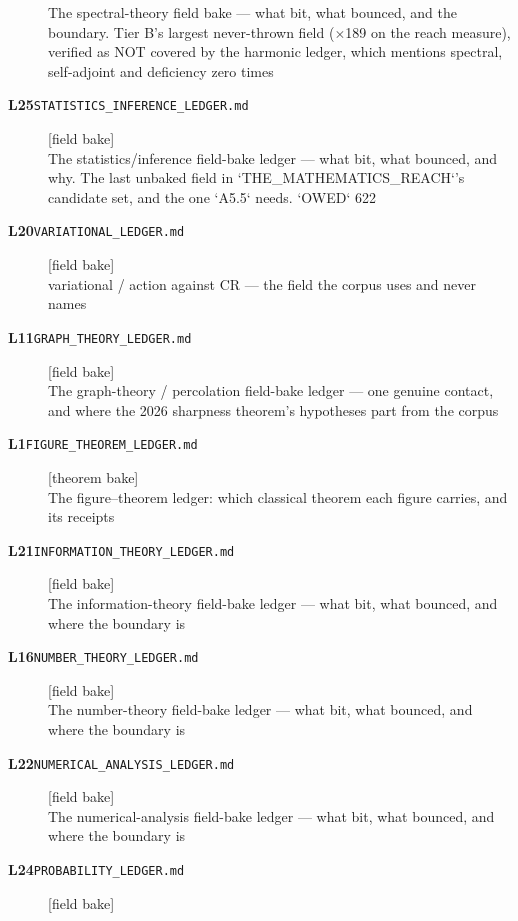 \begin{description}
The spectral-theory field bake --- what bit, what bounced, and the boundary. Tier B's largest never-thrown field ($\times$189 on the reach measure), verified as NOT covered by the harmonic ledger, which mentions spectral, self-adjoint and deficiency zero times
\item[\ldglabel{statistics_inference}{L25}\textbf{L25}\quad\texttt{STATISTICS\_INFERENCE\_LEDGER.md}]\hfill\textsf{[field bake]}\\
The statistics/inference field-bake ledger --- what bit, what bounced, and why. The last unbaked field in `THE\_MATHEMATICS\_REACH`'s candidate set, and the one `A5.5` needs. `OWED` 622
\item[\ldglabel{variational}{L20}\textbf{L20}\quad\texttt{VARIATIONAL\_LEDGER.md}]\hfill\textsf{[field bake]}\\
variational / action against CR --- the field the corpus uses and never names
\item[\ldglabel{graph_theory}{L11}\textbf{L11}\quad\texttt{GRAPH\_THEORY\_LEDGER.md}]\hfill\textsf{[field bake]}\\
The graph-theory / percolation field-bake ledger --- one genuine contact, and where the 2026 sharpness theorem's hypotheses part from the corpus
\item[\ldglabel{figure_theorem}{L1}\textbf{L1}\quad\texttt{FIGURE\_THEOREM\_LEDGER.md}]\hfill\textsf{[theorem bake]}\\
The figure--theorem ledger: which classical theorem each figure carries, and its receipts
\item[\ldglabel{information_theory}{L21}\textbf{L21}\quad\texttt{INFORMATION\_THEORY\_LEDGER.md}]\hfill\textsf{[field bake]}\\
The information-theory field-bake ledger --- what bit, what bounced, and where the boundary is
\item[\ldglabel{number_theory}{L16}\textbf{L16}\quad\texttt{NUMBER\_THEORY\_LEDGER.md}]\hfill\textsf{[field bake]}\\
The number-theory field-bake ledger --- what bit, what bounced, and where the boundary is
\item[\ldglabel{numerical_analysis}{L22}\textbf{L22}\quad\texttt{NUMERICAL\_ANALYSIS\_LEDGER.md}]\hfill\textsf{[field bake]}\\
The numerical-analysis field-bake ledger --- what bit, what bounced, and where the boundary is
\item[\ldglabel{probability}{L24}\textbf{L24}\quad\texttt{PROBABILITY\_LEDGER.md}]\hfill\textsf{[field bake]}\\

\end{description}
